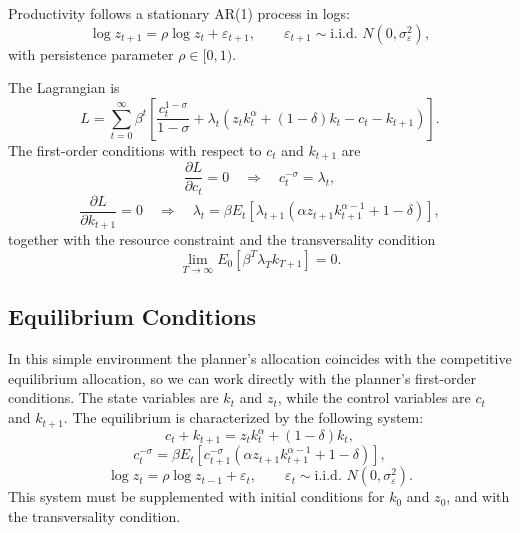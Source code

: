 \documentclass[12pt]{article}
\begin{document}
Productivity follows a stationary AR(1) process in logs:
\begin{equation*}
\log z_{t+1} = \rho \log z_t + \varepsilon_{t+1},
\qquad
\varepsilon_{t+1} \sim \text{i.i.d. } N(0,\sigma_\varepsilon^2),
\end{equation*}
with persistence parameter $\rho \in [0,1)$.

The Lagrangian is
\begin{equation*}
L = \sum_{t=0}^{\infty}\beta^t
\left[
\frac{c_t^{1-\sigma}}{1-\sigma}
+ \lambda_t\left(z_t k_t^\alpha + (1-\delta)k_t - c_t - k_{t+1}\right)
\right].
\end{equation*}
The first-order conditions with respect to $c_t$ and $k_{t+1}$ are
\begin{equation*}
\frac{\partial L}{\partial c_t}=0
\quad \Longrightarrow \quad
c_t^{-\sigma} = \lambda_t,
\end{equation*}
\begin{equation*}
\frac{\partial L}{\partial k_{t+1}}=0
\quad \Longrightarrow \quad
\lambda_t = \beta E_t\left[
\lambda_{t+1}\left(\alpha z_{t+1}k_{t+1}^{\alpha-1} + 1-\delta\right)
\right],
\end{equation*}
together with the resource constraint and the transversality condition
\begin{equation*}
\lim_{T\to\infty} E_0\left[\beta^T \lambda_T k_{T+1}\right] = 0.
\end{equation*}

\subsection{Equilibrium Conditions}

In this simple environment the planner's allocation coincides with the competitive equilibrium allocation, so we can work directly with the planner's first-order conditions. The state variables are $k_t$ and $z_t$, while the control variables are $c_t$ and $k_{t+1}$. The equilibrium is characterized by the following system:
\begin{equation}
c_t + k_{t+1} = z_t k_t^\alpha + (1-\delta)k_t,
\label{eq:resource}
\end{equation}
\begin{equation}
c_t^{-\sigma} = \beta E_t\left[
c_{t+1}^{-\sigma}\left(\alpha z_{t+1}k_{t+1}^{\alpha-1}+1-\delta\right)
\right],
\label{eq:euler}
\end{equation}
\begin{equation}
\log z_t = \rho \log z_{t-1} + \varepsilon_t,
\qquad
\varepsilon_t \sim \text{i.i.d. } N(0,\sigma_\varepsilon^2).
\label{eq:ar1}
\end{equation}
This system must be supplemented with initial conditions for $k_0$ and $z_0$, and with the transversality condition.
\end{document}
